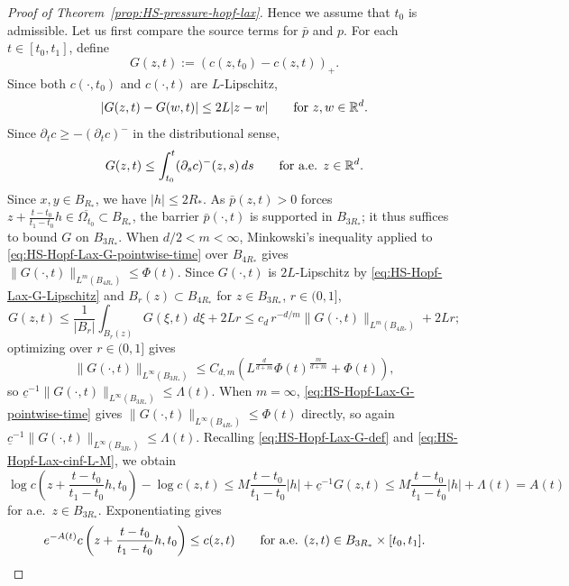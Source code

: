 \documentclass[11pt]{amsart}
\numberwithin{equation}{section}
\numberwithin{figure}{section}
\theoremstyle{plain}
\theoremstyle{definition}
\theoremstyle{remark}
\theoremstyle{plain}
\newcommand{\abs}[1]{\lvert #1 \rvert}
\newcommand{\norm}[1]{\lVert #1 \rVert}
\def\R{\mathbb{R}}
\begin{document}
\begin{proof}[Proof of Theorem~\ref{prop:HS-pressure-hopf-lax}]
Hence we assume that $t_0$ is admissible. Let us first compare the source terms for $\bar{p}$ and $p$.
For each
\(t\in[t_0,t_1]\), define
\begin{equation}\label{eq:HS-Hopf-Lax-G-def}
    G(z,t):=(c(z,t_0)-c(z,t))_+ .
\end{equation}
Since both \(c(\cdot,t_0)\) and \(c(\cdot,t)\) are \(L\)-Lipschitz,
\begin{equation}\label{eq:HS-Hopf-Lax-G-Lipschitz}
    \abs{G(z,t)-G(w,t)}\leq 2L\abs{z-w}
    \qquad\hbox{for }z,w\in\R^d .
\end{equation}
Since \(\partial_t c\geq-(\partial_t c)^-\) in the distributional sense,
\begin{equation}\label{eq:HS-Hopf-Lax-G-pointwise-time}
    G(z,t)\leq\int_{t_0}^t(\partial_s c)^-(z,s)\,ds
    \qquad\hbox{for a.e. }z\in\R^d .
\end{equation}
Since \(x,y\in B_{R_*}\), we have \(\abs h\leq 2R_*\).  As
\(\bar p(z,t)>0\) forces \(z+\frac{t-t_0}{t_1-t_0}h\in\overline{\Omega_{t_0}}\subset B_{R_*}\),
the barrier \(\bar p(\cdot,t)\) is supported in \(B_{3R_*}\); it thus suffices to
bound \(G\) on \(B_{3R_*}\).  When \(d/2< m<\infty\), Minkowski's inequality
applied to \eqref{eq:HS-Hopf-Lax-G-pointwise-time} over \(B_{4R_*}\) gives
\(\norm{G(\cdot,t)}_{L^m(B_{4R_*})}\leq\Phi(t)\).  Since \(G(\cdot,t)\) is
\(2L\)-Lipschitz by \eqref{eq:HS-Hopf-Lax-G-Lipschitz} and \(B_r(z)\subset B_{4R_*}\)
for \(z\in B_{3R_*}\), \(r\in(0,1]\),
\[
    G(z,t)\leq \frac1{\abs{B_r}}\int_{B_r(z)}G(\xi,t)\,d\xi+2Lr
    \leq c_d\,r^{-d/ m}\norm{G(\cdot,t)}_{L^m(B_{4R_*})}+2Lr ;
\]
optimizing over \(r\in(0,1]\) gives
\[
    \norm{G(\cdot,t)}_{L^\infty(B_{3R_*})}
    \leq
    C_{d, m}\left(L^{\frac{d}{d+ m}}\Phi(t)^{\frac{m}{d+ m}}+\Phi(t)\right),
\]
so \(\underline c^{-1}\norm{G(\cdot,t)}_{L^\infty(B_{3R_*})}\leq\Lambda(t)\).  When
\(m=\infty\), \eqref{eq:HS-Hopf-Lax-G-pointwise-time} gives
\(\norm{G(\cdot,t)}_{L^\infty(B_{4R_*})}\leq\Phi(t)\) directly, so again
\(\underline c^{-1}\norm{G(\cdot,t)}_{L^\infty(B_{3R_*})}\leq\Lambda(t)\).  Recalling
\eqref{eq:HS-Hopf-Lax-G-def} and \eqref{eq:HS-Hopf-Lax-cinf-L-M},  we obtain
\[
    \log c\left(z+\frac{t-t_0}{t_1-t_0}h,t_0\right)-\log c(z,t)
    \leq M\frac{t-t_0}{t_1-t_0}\abs{h}+\underline c^{-1}G(z,t)
    \leq M\frac{t-t_0}{t_1-t_0}\abs{h}+\Lambda(t)
    =A(t)
\]
for a.e.\ \(z\in B_{3R_*}\).  Exponentiating gives
\begin{equation}\label{eq:HS-Hopf-Lax-source-control}
    e^{-A(t)}
    c\left(z+\frac{t-t_0}{t_1-t_0}h,t_0\right)
    \leq c(z,t)
    \qquad\hbox{for a.e. }(z,t)\in B_{3R_*}\times[t_0,t_1].
\end{equation}


\end{proof}
\end{document}
